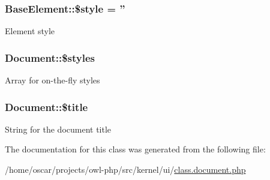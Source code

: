 \subsubsection[{\$style}]{\setlength{\rightskip}{0pt plus 5cm}BaseElement::\$style = ''}\label{classBaseElement_a429a3d642dd95f30e1059ef29564b87d}
Element style 
\subsubsection[{\$styles}]{\setlength{\rightskip}{0pt plus 5cm}Document::\$styles}\label{classDocument_a5ef42574b069d405190dea3a7d977cb2}
Array for on-\/the-\/fly styles 
\subsubsection[{\$title}]{\setlength{\rightskip}{0pt plus 5cm}Document::\$title}\label{classDocument_a7cd6b0f7a5c8926d8b89e23bee51e7f5}
String for the document title 

The documentation for this class was generated from the following file:\begin{DoxyCompactItemize}
\item 
/home/oscar/projects/owl-\/php/src/kernel/ui/\hyperlink{class_8document_8php}{class.document.php}\end{DoxyCompactItemize}

